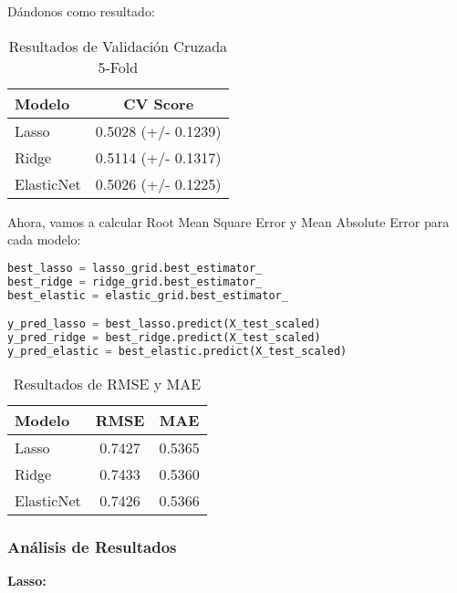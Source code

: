 \documentclass[12pt,a4paper]{article}
\begin{document}
\newpage

Dándonos como resultado: 

\begin{table}[H]
\centering
\caption{Resultados de Validación Cruzada 5-Fold}\label{tab:cross_validation_LRE}
\footnotesize
\begin{tabular}{lc}
\toprule
\textbf{Modelo} & \textbf{CV Score}\\
\midrule
Lasso & 0.5028 (+/- 0.1239) \\
Ridge & 0.5114 (+/- 0.1317) \\
ElasticNet & 0.5026 (+/- 0.1225) \\
\bottomrule
\end{tabular}
\end{table}

\vspace{0.5cm}

Ahora, vamos a calcular Root Mean Square Error y Mean Absolute Error para cada modelo:

\begin{lstlisting}[language=Python, frame=single, basicstyle=\ttfamily\small, breaklines=true]
best_lasso = lasso_grid.best_estimator_
best_ridge = ridge_grid.best_estimator_
best_elastic = elastic_grid.best_estimator_

y_pred_lasso = best_lasso.predict(X_test_scaled)
y_pred_ridge = best_ridge.predict(X_test_scaled)
y_pred_elastic = best_elastic.predict(X_test_scaled)
\end{lstlisting}

\begin{table}[H]
\centering
\caption{Resultados de RMSE y MAE}\label{tab:RMSE_MAE}
\footnotesize
\begin{tabular}{lcc}
\toprule
\textbf{Modelo} & \textbf{RMSE} & \textbf{MAE}\\
\midrule
Lasso & 0.7427 & 0.5365\\
Ridge & 0.7433 & 0.5360\\
ElasticNet & 0.7426 & 0.5366\\
\bottomrule
\end{tabular}
\end{table}

\subsubsection{Análisis de Resultados}

\vspace{0.5cm}

\textbf{Lasso:}
\end{document}
